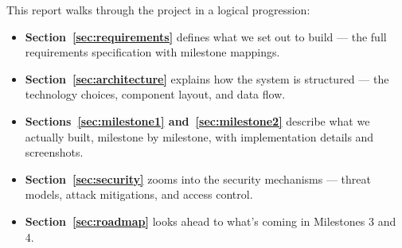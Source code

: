 This report walks through the project in a logical progression:

\begin{itemize}
    \item \textbf{Section~\ref{sec:requirements}} defines what we set out to build — the full requirements specification with milestone mappings.
    \item \textbf{Section~\ref{sec:architecture}} explains how the system is structured — the technology choices, component layout, and data flow.
    \item \textbf{Sections~\ref{sec:milestone1} and~\ref{sec:milestone2}} describe what we actually built, milestone by milestone, with implementation details and screenshots.
    \item \textbf{Section~\ref{sec:security}} zooms into the security mechanisms — threat models, attack mitigations, and access control.
    \item \textbf{Section~\ref{sec:roadmap}} looks ahead to what's coming in Milestones 3 and 4.
\end{itemize}
